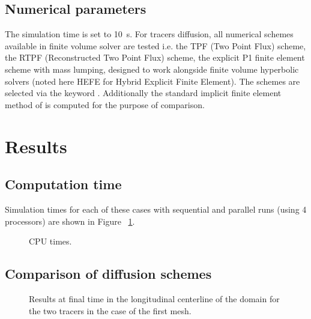 \subsection{Numerical parameters}

The simulation time is set to 10~s.
For tracers diffusion, all numerical schemes available in  finite
volume solver are tested
i.e. the TPF (Two Point Flux) scheme, the RTPF (Reconstructed Two Point Flux)
scheme,
the explicit P1
finite element scheme with mass lumping, designed to work alongside finite
volume hyperbolic solvers (noted here HEFE for Hybrid Explicit Finite Element).
The schemes are selected via the keyword
.
Additionally the standard implicit finite element method of  is
computed for the purpose of comparison.

\section{Results}

\subsection{Computation time}

Simulation times for each of these cases with sequential and parallel runs
(using 4 processors) are shown in Figure ~\ref{fig:cone_diffusion:cputime}.

\begin{figure}[H]
  \centering
  \caption{CPU times.}\label{fig:cone_diffusion:cputime}
\end{figure}

\subsection{Comparison of diffusion schemes}

\begin{figure}[h!]
 \centering
 \caption{Results at final time in the longitudinal centerline of the domain for the
 two tracers in the case of the first mesh.}
 \label{t2d:cone_diffusion:slices_tf}
\end{figure}

